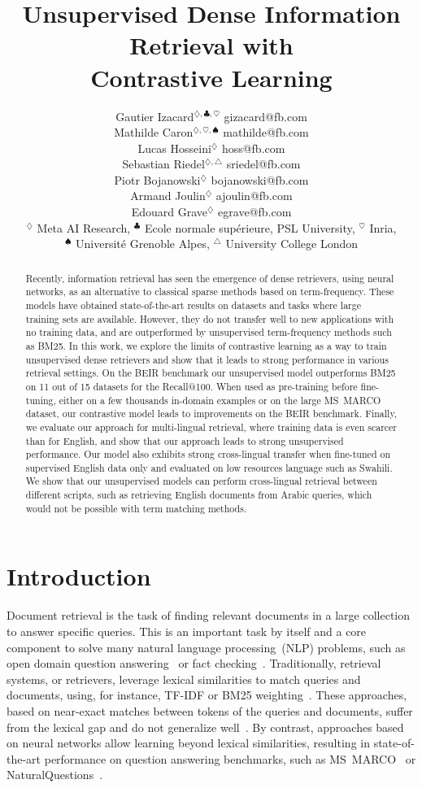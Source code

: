 \documentclass[10pt]{article} %
\title{Unsupervised Dense Information Retrieval with\\ Contrastive Learning}
\author{\name Gautier Izacard$^{\diamondsuit, \clubsuit, \heartsuit}$ \email gizacard@fb.com \\
  \name Mathilde Caron$^{\diamondsuit, \heartsuit, \spadesuit}$ \email mathilde@fb.com \\
  \name Lucas Hosseini$^{\diamondsuit}$ \email hoss@fb.com \\
  \name Sebastian Riedel$^{\diamondsuit, \triangle}$ \email sriedel@fb.com \\
  \name Piotr Bojanowski$^{\diamondsuit}$ \email bojanowski@fb.com \\
  \name Armand Joulin$^{\diamondsuit}$ \email ajoulin@fb.com \\
  \name Edouard Grave$^{\diamondsuit}$ \email egrave@fb.com \\
  \addr $^\diamondsuit$ Meta AI Research,
  $^\clubsuit$ Ecole normale supérieure, PSL University,
  $^\heartsuit$ Inria, \\
  $^\spadesuit$ Université Grenoble Alpes,
  $^\triangle$ University College London
}
\begin{document}
\maketitle
\begin{abstract}
Recently, information retrieval has seen the emergence of dense retrievers, using neural networks, as an alternative to classical sparse methods based on term-frequency.
These models have obtained state-of-the-art results on datasets and tasks where large training sets are available.
However, they do not transfer well to new applications with no training data, and are outperformed by unsupervised term-frequency methods such as BM25.
In this work, we explore the limits of contrastive learning as a way to train unsupervised dense retrievers and show that it leads to strong performance in various retrieval settings.
On the BEIR benchmark our unsupervised model outperforms BM25 on 11 out of 15 datasets for the Recall@100.
When used as pre-training before fine-tuning, either on a few thousands in-domain examples or on the large MS~MARCO dataset, our contrastive model leads to improvements on the BEIR benchmark.
Finally, we evaluate our approach for multi-lingual retrieval, where training data is even scarcer than for English, and show that our approach leads to strong unsupervised performance.
Our model also exhibits strong cross-lingual transfer when fine-tuned on supervised English data only and evaluated on low resources language such as Swahili.
We show that our unsupervised models can perform cross-lingual retrieval between different scripts, such as retrieving English documents from Arabic queries, which would not be possible with term matching methods.
\end{abstract}

\section{Introduction}
Document retrieval is the task of finding relevant documents in a large collection to answer specific queries.
This is an important task by itself and a core component to solve many natural language processing~(NLP) problems, such as open domain question answering~\citep{chen2017reading} or fact checking~\citep{thorne2018fever}.
Traditionally, retrieval systems, or retrievers, leverage lexical similarities to match queries and documents, using, for instance, TF-IDF or BM25 weighting~\citep{robertson2009probabilistic}. 
These approaches, based on near-exact matches between tokens of the queries and documents, suffer from the lexical gap and do not generalize well~\citep{berger2000bridging}.
By contrast, approaches based on neural networks allow learning beyond lexical similarities, resulting in state-of-the-art performance on question answering benchmarks, such as  MS~MARCO~\citep{nguyen2016ms} or NaturalQuestions~\citep{kwiatkowski2019natural}.
\end{document}
